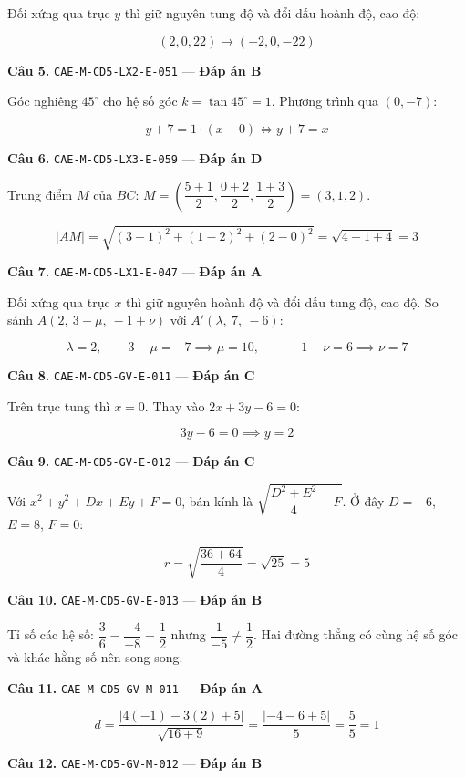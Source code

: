 \documentclass[11pt, a4paper]{article}
\begin{document}
Đối xứng qua trục $y$ thì giữ nguyên tung độ và đổi dấu hoành độ, cao độ:

$$(2, 0, 22) \to (-2, 0, -22)$$

\textbf{Câu 5.} \texttt{CAE-M-CD5-LX2-E-051} — \textbf{Đáp án B}

Góc nghiêng $45^\circ$ cho hệ số góc $k = \tan 45^\circ = 1$. Phương trình qua $(0,-7)$:

$$y + 7 = 1 \cdot (x - 0) \iff y + 7 = x$$

\textbf{Câu 6.} \texttt{CAE-M-CD5-LX3-E-059} — \textbf{Đáp án D}

Trung điểm $M$ của $BC$: $M = \left(\dfrac{5+1}{2}, \dfrac{0+2}{2}, \dfrac{1+3}{2}\right) = (3, 1, 2)$.

$$\lvert AM \rvert = \sqrt{(3-1)^2 + (1-2)^2 + (2-0)^2} = \sqrt{4 + 1 + 4} = 3$$

\textbf{Câu 7.} \texttt{CAE-M-CD5-LX1-E-047} — \textbf{Đáp án A}

Đối xứng qua trục $x$ thì giữ nguyên hoành độ và đổi dấu tung độ, cao độ. So sánh $A(2,\ 3-\mu,\ -1+\nu)$ với $A'(\lambda,\ 7,\ -6)$:

$$\lambda = 2, \qquad 3 - \mu = -7 \implies \mu = 10, \qquad -1 + \nu = 6 \implies \nu = 7$$

\textbf{Câu 8.} \texttt{CAE-M-CD5-GV-E-011} — \textbf{Đáp án C}

Trên trục tung thì $x = 0$. Thay vào $2x + 3y - 6 = 0$:

$$3y - 6 = 0 \implies y = 2$$

\textbf{Câu 9.} \texttt{CAE-M-CD5-GV-E-012} — \textbf{Đáp án C}

Với $x^2 + y^2 + Dx + Ey + F = 0$, bán kính là $\sqrt{\dfrac{D^2 + E^2}{4} - F}$. Ở đây $D = -6$, $E = 8$, $F = 0$:

$$r = \sqrt{\frac{36 + 64}{4}} = \sqrt{25} = 5$$

\textbf{Câu 10.} \texttt{CAE-M-CD5-GV-E-013} — \textbf{Đáp án B}

Tỉ số các hệ số: $\dfrac{3}{6} = \dfrac{-4}{-8} = \dfrac{1}{2}$ nhưng $\dfrac{1}{-5} \ne \dfrac{1}{2}$. Hai đường thẳng có cùng hệ số góc và khác hằng số nên song song.

\textbf{Câu 11.} \texttt{CAE-M-CD5-GV-M-011} — \textbf{Đáp án A}

$$d = \frac{\lvert 4(-1) - 3(2) + 5 \rvert}{\sqrt{16 + 9}} = \frac{\lvert -4 - 6 + 5 \rvert}{5} = \frac{5}{5} = 1$$

\textbf{Câu 12.} \texttt{CAE-M-CD5-GV-M-012} — \textbf{Đáp án B}
\end{document}
